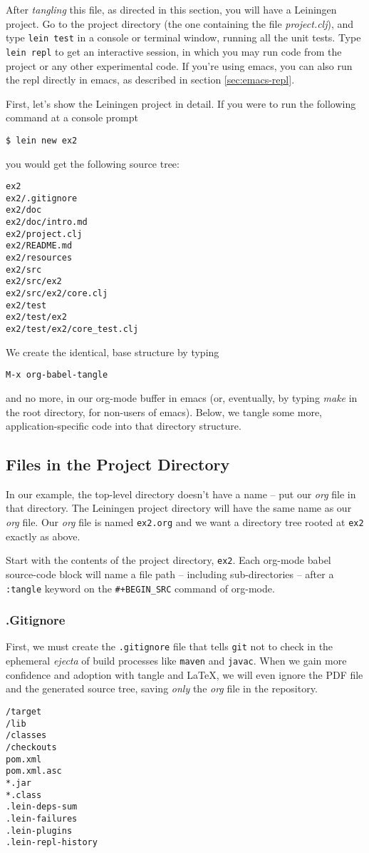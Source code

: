 \documentclass[11pt]{article}
\begin{document}
After \emph{tangling} this file, as directed in this section, you will
have a Leiningen project. Go to the project directory (the one
containing the file \emph{project.clj}), and type \verb|lein test| in a
console or terminal window, running all the unit tests. Type
\verb|lein repl| to get an interactive session, in which you may run
code from the project or any other experimental code. If you're
using emacs, you can also run the repl directly in emacs, as
described in section \ref{sec:emacs-repl}.

First, let's show the Leiningen project in detail. If you were to
run the following command at a console prompt
\begin{verbatim}
$ lein new ex2
\end{verbatim}
you would get the following source tree:
\begin{verbatim}
ex2
ex2/.gitignore
ex2/doc
ex2/doc/intro.md
ex2/project.clj
ex2/README.md
ex2/resources
ex2/src
ex2/src/ex2
ex2/src/ex2/core.clj
ex2/test
ex2/test/ex2
ex2/test/ex2/core_test.clj
\end{verbatim}
We create the identical, base structure by typing
\begin{verbatim}
M-x org-babel-tangle
\end{verbatim}
and no more, in our org-mode buffer in emacs (or, eventually, by
typing \emph{make} in the root directory, for non-users of emacs). Below,
we tangle some more, application-specific code into that directory
structure.

\subsection{Files in the Project Directory}
\label{sec-2-1}
In our example, the top-level directory doesn't have a name --
put our \emph{org} file in that directory. The Leiningen project directory
will have the same name as our \emph{org} file. Our \emph{org} file is named
\verb+ex2.org+ and we want a directory tree rooted at \verb+ex2+
exactly as above.

Start with the contents of the project directory, \verb+ex2+. Each
org-mode babel source-code block will name a file path -- including
sub-directories -- after a \verb+:tangle+ keyword on the
\texttt{\#+BEGIN\_SRC} command of org-mode.
\subsubsection{.Gitignore}
\label{sec-2-1-1}
First, we must create the \verb+.gitignore+ file that tells
\verb+git+ not to check in the ephemeral \emph{ejecta} of build
processes like \verb+maven+ and \verb+javac+. When we gain more
confidence and adoption with tangle and \LaTeX{}, we will even
ignore the PDF file and the generated source tree, saving \emph{only}
the \emph{org} file in the repository.
\begin{verbatim}
/target
/lib
/classes
/checkouts
pom.xml
pom.xml.asc
*.jar
*.class
.lein-deps-sum
.lein-failures
.lein-plugins
.lein-repl-history
\end{verbatim}
\end{document}
